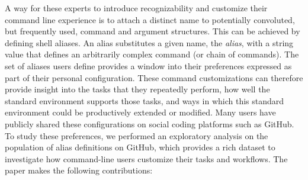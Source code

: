 A way for these experts to introduce recognizability and customize their command line experience is to attach a distinct name to potentially convoluted, but frequently used, command and argument structures.
This can be achieved by defining shell aliases.
An alias substitutes a given name, the \emph{alias}, with a string value that defines an arbitrarily complex command (or chain of commands).
The set of aliases users define provides a window into their preferences expressed as part of their personal configuration.
These command customizations can therefore provide insight into the tasks that they repeatedly perform, how well the standard environment supports those tasks, and ways in which this standard environment could be productively extended or modified.
Many users have publicly shared these configurations on social coding platforms such as GitHub.
To study these preferences, we performed an exploratory analysis on the population of alias definitions on GitHub, which provides a rich dataset to investigate how command-line users customize their tasks and workflows. The paper makes the following contributions:
